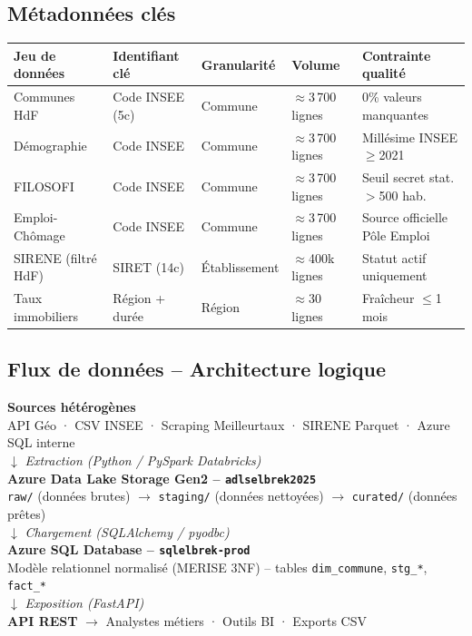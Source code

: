 \documentclass[11pt,a4paper]{article}
\begin{document}
\subsection{Métadonnées clés}

\begin{tabular}{L{3cm} L{3cm} L{2cm} L{2cm} L{3.5cm}}
  \toprule
  \textbf{Jeu de données} & \textbf{Identifiant clé} & \textbf{Granularité} & \textbf{Volume} & \textbf{Contrainte qualité} \\
  \midrule
  Communes HdF & Code INSEE (5c) & Commune & $\approx$3\,700 lignes & 0\% valeurs manquantes \\
  Démographie & Code INSEE & Commune & $\approx$3\,700 lignes & Millésime INSEE $\geq$2021 \\
  FILOSOFI & Code INSEE & Commune & $\approx$3\,700 lignes & Seuil secret stat. $>$500 hab. \\
  Emploi-Chômage & Code INSEE & Commune & $\approx$3\,700 lignes & Source officielle Pôle Emploi \\
  SIRENE (filtré HdF) & SIRET (14c) & Établissement & $\approx$400k lignes & Statut actif uniquement \\
  Taux immobiliers & Région + durée & Région & $\approx$30 lignes & Fraîcheur $\leq$1 mois \\
  \bottomrule
\end{tabular}

\subsection{Flux de données -- Architecture logique}

\begin{tcolorbox}[gris]
\begin{center}
\textbf{Sources hétérogènes}\\
{\small API Géo · CSV INSEE · Scraping Meilleurtaux · SIRENE Parquet · Azure SQL interne}\\[0.3em]
$\downarrow$ \textit{Extraction (Python / PySpark Databricks)}\\[0.3em]
\textbf{Azure Data Lake Storage Gen2 -- \texttt{adlselbrek2025}}\\
{\small \texttt{raw/} (données brutes) $\to$ \texttt{staging/} (données nettoyées) $\to$ \texttt{curated/} (données prêtes)}\\[0.3em]
$\downarrow$ \textit{Chargement (SQLAlchemy / pyodbc)}\\[0.3em]
\textbf{Azure SQL Database -- \texttt{sqlelbrek-prod}}\\
{\small Modèle relationnel normalisé (MERISE 3NF) -- tables \texttt{dim\_commune}, \texttt{stg\_*}, \texttt{fact\_*}}\\[0.3em]
$\downarrow$ \textit{Exposition (FastAPI)}\\[0.3em]
\textbf{API REST} $\to$ Analystes métiers · Outils BI · Exports CSV
\end{center}
\end{tcolorbox}
\end{document}
